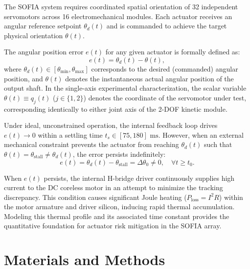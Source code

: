 \documentclass[lettersize,journal]{IEEEtran}
\begin{document}
	The SOFIA system requires coordinated spatial orientation of 32 independent servomotors across 16 electromechanical modules. Each actuator receives an angular reference setpoint $\theta_d(t)$ and is commanded to achieve the target physical orientation $\theta(t)$.
	
	The angular position error $e(t)$ for any given actuator is formally defined as:
	\begin{equation}
		e(t) = \theta_d(t) - \theta(t),
		\label{eq:position_error}
	\end{equation}
	where $\theta_d(t) \in [\theta_{\min}, \theta_{\max}]$ corresponds to the desired (commanded) angular position, and $\theta(t)$ denotes the instantaneous actual angular position of the output shaft. In the single-axis experimental characterization, the scalar variable $\theta(t) \equiv q_j(t)$ ($j \in \{1, 2\}$) denotes the coordinate of the servomotor under test, corresponding identically to either joint axis of the 2-DOF kinetic module.
	
	Under ideal, unconstrained operation, the internal feedback loop drives $e(t) \to 0$ within a settling time $t_s \in [75, 180]\text{ ms}$. However, when an external mechanical constraint prevents the actuator from reaching $\theta_d(t)$ such that $\theta(t) = \theta_{\text{stall}} \neq \theta_d(t)$, the error persists indefinitely:
	\begin{equation}
		e(t) = \theta_d(t) - \theta_{\text{stall}} = \Delta\theta_0 \neq 0, \quad \forall t \ge t_0.
		\label{eq:persistent_error}
	\end{equation}
	
	When $e(t)$ persists, the internal H-bridge driver continuously supplies high current to the DC coreless motor in an attempt to minimize the tracking discrepancy. This condition causes significant Joule heating ($P_{\text{loss}} = I^2 R$) within the motor armature and driver silicon, inducing rapid thermal accumulation. Modeling this thermal profile and its associated time constant provides the quantitative foundation for actuator risk mitigation in the SOFIA array.
	
	\section{Materials and Methods}
	\label{sec:methods}
	
\end{document}
